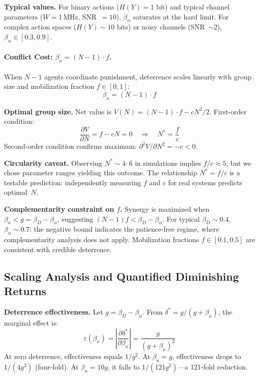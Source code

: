\documentclass[11pt]{article}
\begin{document}
\textbf{Typical values.} For binary actions ($H(Y) = 1$ bit) and typical channel parameters ($W = 1$\,MHz, SNR~$= 10$), $\beta_\alpha$ saturates at the hard limit. For complex action spaces ($H(Y) \sim 10$ bits) or noisy channels (SNR~$\sim 2$), $\beta_\alpha \in [0.3, 0.9]$.

\paragraph{Conflict Cost: $\beta_\kappa = (N-1) \cdot f$.}
When $N-1$ agents coordinate punishment, deterrence scales linearly with group size and mobilization fraction $f \in [0,1]$:
\begin{equation}
\beta_\kappa = (N-1) \cdot f
\end{equation}

\textbf{Optimal group size.} Net value is $V(N) = (N-1) \cdot f - c N^2/2$. First-order condition:
\begin{equation}
\frac{\partial V}{\partial N} = f - cN = 0 \quad \Rightarrow \quad N^* = \frac{f}{c}
\label{eq:nstar}
\end{equation}
Second-order condition confirms maximum: $\partial^2 V/\partial N^2 = -c < 0$.

\textbf{Circularity caveat.} Observing $N^* \sim 4$--$6$ in simulations implies $f/c \approx 5$, but we chose parameter ranges yielding this outcome. The relationship $N^* = f/c$ is a testable prediction: independently measuring $f$ and $c$ for real systems predicts optimal~$N$.

\textbf{Complementarity constraint on $f$.} Synergy is maximized when $\beta_\kappa < g = \beta_D - \beta_\alpha$, suggesting $(N-1)f < \beta_D - \beta_\alpha$. For typical $\beta_D \sim 0.4$, $\beta_\alpha \sim 0.7$: the negative bound indicates the patience-free regime, where complementarity analysis does not apply. Mobilization fractions $f \in [0.1, 0.5]$ are consistent with credible deterrence.

\subsection{Scaling Analysis and Quantified Diminishing Returns}
\label{sec:S2.6}

\textbf{Deterrence effectiveness.} Let $g = \beta_D - \beta_\alpha$. From $\delta^* = g/(g+\beta_\kappa)$, the marginal effect is:
\begin{equation}
\varepsilon(\beta_\kappa) = \left|\frac{\partial \delta^*}{\partial \beta_\kappa}\right| = \frac{g}{(g + \beta_\kappa)^2}
\end{equation}
At zero deterrence, effectiveness equals $1/g^2$. At $\beta_\kappa = g$, effectiveness drops to $1/(4g^2)$ (four-fold). At $\beta_\kappa = 10g$, it falls to $1/(121g^2)$---a 121-fold reduction.
\end{document}
